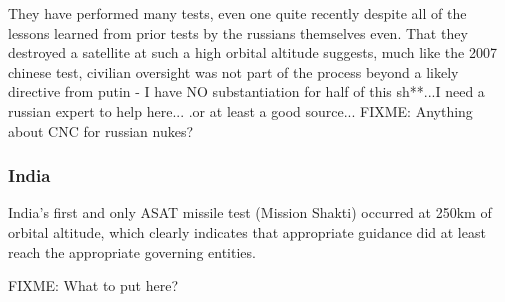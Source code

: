 They have performed many tests, even one quite recently despite all of the lessons learned from prior tests by the russians themselves even.
That they destroyed a satellite at such a high orbital altitude suggests, much like the 2007 chinese test, civilian oversight was not part of the process beyond a likely directive from putin - I have NO substantiation for half of this sh**...I need a russian expert to help here... .or at least a good source...
FIXME: Anything about CNC for russian nukes?

\subsubsection{India}
India's first and only ASAT missile test (Mission Shakti) occurred at
250km of orbital altitude, which clearly indicates that appropriate
guidance did at least reach the appropriate governing entities.

FIXME: What to put here?

